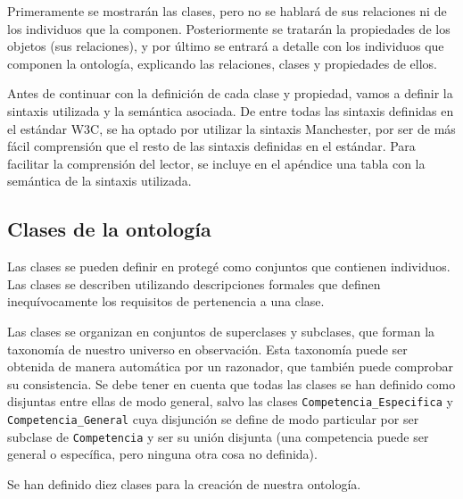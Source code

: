 Primeramente se mostrarán las clases, pero no se hablará de sus relaciones ni de los individuos que la componen. Posteriormente se tratarán la propiedades de los objetos (sus relaciones), y por último se entrará a detalle con los individuos que componen la ontología, explicando las relaciones, clases y propiedades de ellos.

Antes de continuar con la definición de cada clase y propiedad, vamos a definir la sintaxis utilizada y la semántica asociada. De entre todas las sintaxis definidas en el estándar W3C, se ha optado por utilizar la sintaxis Manchester, por ser de más fácil comprensión que el resto de las sintaxis definidas en el estándar. Para facilitar la comprensión del lector, se incluye en el apéndice una tabla con la semántica de la sintaxis utilizada.

\subsection{Clases de la ontología}
	\lstset{language=protege,basicstyle=\sffamily,columns=flexible,mathescape}
	Las clases se pueden definir en protegé como conjuntos que contienen individuos. Las clases se describen utilizando descripciones formales que definen inequívocamente los requisitos de pertenencia a una clase. 
	
	Las clases se organizan en conjuntos de superclases y subclases, que forman la taxonomía de nuestro universo en observación. Esta taxonomía puede ser obtenida de manera automática por un razonador, que también puede comprobar su consistencia. Se debe tener en cuenta que todas las clases se han definido como disjuntas entre ellas de modo general, salvo las clases \lstinline!Competencia_Especifica! y \lstinline!Competencia_General! cuya disjunción se define de modo particular por ser subclase de \lstinline!Competencia! y ser su unión disjunta (una competencia puede ser general o específica, pero ninguna otra cosa no definida).

  
	Se han definido diez clases para la creación de nuestra ontología.	

